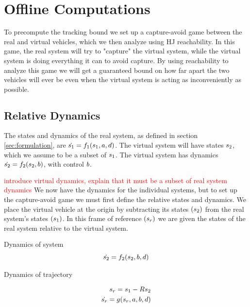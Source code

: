 \section{Offline Computations \label{sec:precomp}}

To precompute the tracking bound we set up a capture-avoid game between the real and virtual vehicles, which we then analyze using HJ reachability. In this game, the real system will try to "capture" the virtual system, while the virtual system is doing everything it can to avoid capture. By using reachability to analyze this game we will get a guaranteed bound on how far apart the two vehicles will ever be even when the virtual system is acting as inconveniently as possible. 

\subsection{Relative Dynamics}
The states and dynamics of the real system, as defined in section \ref{sec:formulation}, are $\dot{s_1} = f_1(s_1, a, d)$. The virtual system will have states $s_2$, which we assume to be a subset of $s_1$. The virtual system has dynamics $\dot{s_2} = f_2(s_2, b)$, with control $b$.

\textcolor{red}{introduce virtual dynamics, explain that it must be a subset of real system dynamics}
We now have the dynamics for the individual systems, but to set up the capture-avoid game we must first define the relative states and dynamics. We place the virtual vehicle at the origin by subtracting its states $(s_2)$ from the real system's states $(s_1)$. In this frame of reference $(s_r)$ we are given the states of the real system relative to the virtual system. 

Dynamics of system
\begin{equation}
\dot{s_2} = f_2(s_2, b, d)
\end{equation}

Dynamics of trajectory

\begin{equation}
\begin{aligned}
s_r = s_1 - Rs_2\\
\dot{s_r} = g(s_r, a, b, d)
\end{aligned}
\end{equation}

